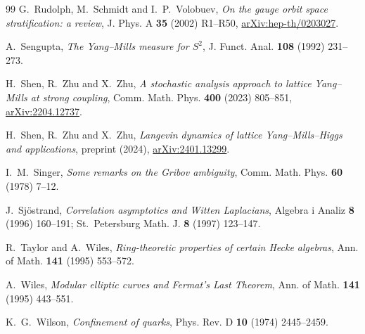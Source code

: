 \documentclass[11pt,reqno]{amsart}
\theoremstyle{plain}
\theoremstyle{definition}
\theoremstyle{remark}
\begin{document}
\begin{thebibliography}{99}
 G.~Rudolph, M.~Schmidt and I.~P.~Volobuev, \emph{On the gauge orbit space stratification: a review}, J. Phys. A \textbf{35} (2002) R1--R50, \href{https://arxiv.org/abs/hep-th/0203027}{arXiv:hep-th/0203027}.

 A.~Sengupta, \emph{The Yang--Mills measure for $S^2$}, J. Funct. Anal. \textbf{108} (1992) 231--273.

 H.~Shen, R.~Zhu and X.~Zhu, \emph{A stochastic analysis approach to lattice Yang--Mills at strong coupling}, Comm. Math. Phys. \textbf{400} (2023) 805--851, \href{https://arxiv.org/abs/2204.12737}{arXiv:2204.12737}.

 H.~Shen, R.~Zhu and X.~Zhu, \emph{Langevin dynamics of lattice Yang--Mills--Higgs and applications}, preprint (2024), \href{https://arxiv.org/abs/2401.13299}{arXiv:2401.13299}.

 I.~M.~Singer, \emph{Some remarks on the Gribov ambiguity}, Comm. Math. Phys. \textbf{60} (1978) 7--12.

 J.~Sj\"ostrand, \emph{Correlation asymptotics and Witten Laplacians}, Algebra i Analiz \textbf{8} (1996) 160--191; St.~Petersburg Math. J. \textbf{8} (1997) 123--147.

 R.~Taylor and A.~Wiles, \emph{Ring-theoretic properties of certain Hecke algebras}, Ann. of Math. \textbf{141} (1995) 553--572.

 A.~Wiles, \emph{Modular elliptic curves and Fermat's Last Theorem}, Ann. of Math. \textbf{141} (1995) 443--551.

 K.~G.~Wilson, \emph{Confinement of quarks}, Phys. Rev. D \textbf{10} (1974) 2445--2459.

\end{thebibliography}
\end{document}
